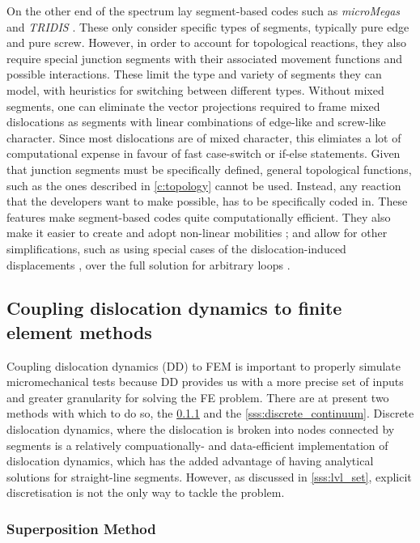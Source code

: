 On the other end of the spectrum lay segment-based codes such as \emph{microMegas} \cite{microMegas,edgeScrewDev} and \emph{TRIDIS} \cite{fivelTridis}. These only consider specific types of segments, typically pure edge and pure screw. However, in order to account for topological reactions, they also require special junction segments with their associated movement functions and possible interactions. These limit the type and variety of segments they can model, with heuristics for switching between different types. Without mixed segments, one can eliminate the vector projections required to frame mixed dislocations as segments with linear combinations of edge-like and screw-like character. Since most dislocations are of mixed character, this elimiates a lot of computational expense in favour of fast case-switch or if-else statements. Given that junction segments must be specifically defined, general topological functions, such as the ones described in \cref{c:topology} cannot be used. Instead, any reaction that the developers want to make possible, has to be specifically coded in. These features make segment-based codes quite computationally efficient. They also make it easier to create and adopt non-linear mobilities \cite{edgeScrewDev}; and allow for other simplifications, such as using special cases of the dislocation-induced displacements \cite{fivelDisplacement}, over the full solution for arbitrary loops \cite{bromage2018calculating}.

\subsection{Coupling dislocation dynamics to finite element methods}
\label{ss:ddd_fem}

Coupling dislocation dynamics (DD) to FEM is important to properly simulate micromechanical tests because DD provides us with a more precise set of inputs and greater granularity for solving the FE problem. There are at present two methods with which to do so, the \cref{sss:superposition} and the \cref{sss:discrete_continuum}. Discrete dislocation dynamics, where the dislocation is broken into nodes connected by segments is a relatively compuationally- and data-efficient implementation of dislocation dynamics, which has the added advantage of having analytical solutions for straight-line segments. However, as discussed in \cref{sss:lvl_set}, explicit discretisation is not the only way to tackle the problem.

\subsubsection{Superposition Method}
\label{sss:superposition}

